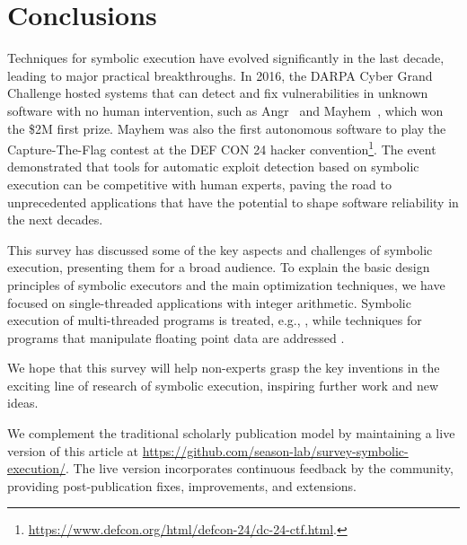 
\vspace{-2pt} %
\section{Conclusions}
\label{se:conclusions}

Techniques for symbolic execution have evolved significantly in the last decade, leading to major practical breakthroughs. In 2016, the DARPA Cyber Grand Challenge hosted systems that can detect and fix vulnerabilities in unknown software with no human intervention, such as {\sc Angr}~\cite{ANGR-SSP16} and {\sc Mayhem}~\cite{MAYHEM-SP12}, which won the \$2M first prize. {\sc Mayhem} was also the first autonomous software to play the Capture-The-Flag contest at the DEF CON 24 hacker convention\footnote{\url{https://www.defcon.org/html/defcon-24/dc-24-ctf.html}.}. The event demonstrated that tools for automatic exploit detection based on symbolic execution can be competitive with human experts, paving the road to unprecedented applications %
that have the potential to shape software %
reliability in the next decades. 

This survey has discussed some of the key aspects and challenges of symbolic execution, presenting them for a broad audience. To explain the basic design principles of symbolic executors and the main optimization techniques, we have focused on single-threaded applications with integer arithmetic. Symbolic execution of multi-threaded programs is treated, e.g., , while techniques for programs that manipulate floating point data are addressed .

We hope that this survey will help non-experts grasp the key inventions in the exciting line of research of symbolic execution, inspiring further work and new ideas.



\ifdefined\arxivver
{}
We complement the traditional scholarly publication model by maintaining a live version of this article at {\href{https://github.com/season-lab/survey-symbolic-execution}{https://github.com/season-lab/survey-symbolic-execution/}}. The live version incorporates continuous feedback by the community, providing post-publication fixes, improvements, and extensions.
\fi
